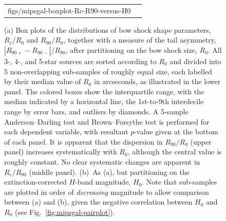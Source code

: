 \begin{figure}
\begin{tabular}{ll}
          {figs/mipsgal-boxplot-Rc-R90-versus-H0}
  \end{tabular}
  \caption{(a) Box plots of the distributions of bow shock shape
    parameters, \(R_c/R_0\) and \(R_{90} / R_0\), together with a
    measure of the tail asymmetry, \(|R_{90+} - R_{90-}| / R_{90}\),
    after partitioning on the bow shock size, \(R_0\).  All 3-, 4-,
    and 5-star sources are sorted according to \(R_0\) and divided
    into 5 non-overlapping sub-samples of roughly equal size, each
    labelled by their median value of \(R_0\) in arcseconds, as
    illustrated in the lower panel.  The colored boxes show the
    interquartile range, with the median indicated by a horizontal
    line, the 1st-to-9th interdecile range by error bars, and outliers
    by diamonds.  A 5-sample Anderson--Darling test and Brown--Forsythe
    test is performed for each dependent variable, with resultant
    \(p\)-value given at the bottom of each panel.   It is apparent
    that the dispersion in \(R_{90} / R_0\) (upper panel) increases
    systematically with \(R_0\), although the central value is roughly
    constant.  No clear systematic changes are apparent in
    \(R_c / R_{90}\) (middle panel).  (b)~As (a), but partitioning on
    the extinction-corrected \(H\)-band magnitude, \(H_0\).  Note that
    sub-samples are plotted in order of \textit{decreasing} magnitude
    to allow comparison between (a) and (b), given the negative
    correlation between \(H_0\) and \(R_0\) (see
    Fig.~\ref{fig:mipsgal-pairplot}).}
  \label{fig:mipsgal-boxplot}
\end{figure}

